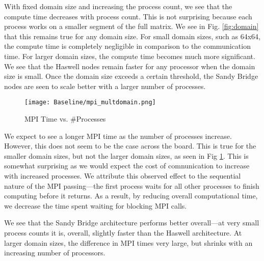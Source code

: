 \begin{enumerate}
With fixed domain size and increasing the process count, we see that the compute time decreases with process count. This is not surprising because each process works on a smaller segment of the full matrix. We see in Fig. \ref{fig:domain} that this remains true for any domain size. For small domain sizes, such as 64x64, the compute time is completely negligible in comparison to the communication time. For larger domain sizes, the compute time becomes much more significant. We see that the Haswell nodes remain faster for any processor when the domain size is small. Once the domain size exceeds a certain threshold, the Sandy Bridge nodes are seen to scale better with a larger number of processes.

	 \begin{figure}[p] %
 		\begin{center}
  		\texttt{[image: Baseline/mpi\_multdomain.png]} %
  		\caption{MPI Time vs. \#Processes}
  		\label{fig:mpi_b}
 	 	\end{center}
 	\end{figure}

We expect to see a longer MPI time as the number of processes increase. However, this does not seem to be the case across the board. This is true for the smaller domain sizes, but not the larger domain sizes, as seen in Fig \ref{fig:mpi_b}. This is somewhat surprising as we would expect the cost of comnunication to increase with increased processes. We attribute this observed effect to the sequential nature of the MPI passing---the first process waits for all other processes to finish computing before it returns. As a result, by reducing overall computational time, we decrease the time spent waiting for blocking MPI calls.

We see that the Sandy Bridge architecture performs better overall---at very small process counts it is, overall, slightly faster than the Haswell architecture. At larger domain sizes, the difference in MPI times very large, but shrinks with an increasing number of processors.

\end{enumerate}

